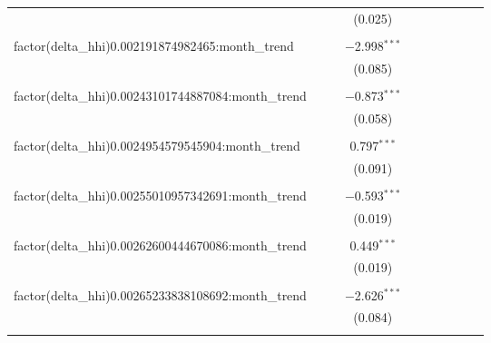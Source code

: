 \begin{table}[H]
{\begin{tabular}{@{\extracolsep{5pt}}lccccccccc}
   &  &  & (0.025) &  &  &  &  &  &  \\  

   & & & & & & & & & \\  

  factor(delta\_hhi)0.002191874982465:month\_trend &  &  & $-$2.998$^{***}$ &  &  &  &  &  &  \\  

   &  &  & (0.085) &  &  &  &  &  &  \\  

   & & & & & & & & & \\  

  factor(delta\_hhi)0.00243101744887084:month\_trend &  &  & $-$0.873$^{***}$ &  &  &  &  &  &  \\  

   &  &  & (0.058) &  &  &  &  &  &  \\  

   & & & & & & & & & \\  

  factor(delta\_hhi)0.0024954579545904:month\_trend &  &  & 0.797$^{***}$ &  &  &  &  &  &  \\  

   &  &  & (0.091) &  &  &  &  &  &  \\  

   & & & & & & & & & \\  

  factor(delta\_hhi)0.00255010957342691:month\_trend &  &  & $-$0.593$^{***}$ &  &  &  &  &  &  \\  

   &  &  & (0.019) &  &  &  &  &  &  \\  

   & & & & & & & & & \\  

  factor(delta\_hhi)0.00262600444670086:month\_trend &  &  & 0.449$^{***}$ &  &  &  &  &  &  \\  

   &  &  & (0.019) &  &  &  &  &  &  \\  

   & & & & & & & & & \\  

  factor(delta\_hhi)0.00265233838108692:month\_trend &  &  & $-$2.626$^{***}$ &  &  &  &  &  &  \\  

   &  &  & (0.084) &  &  &  &  &  &  \\  

   & & & & & & & & & \\  


\end{tabular}}
\end{table}
